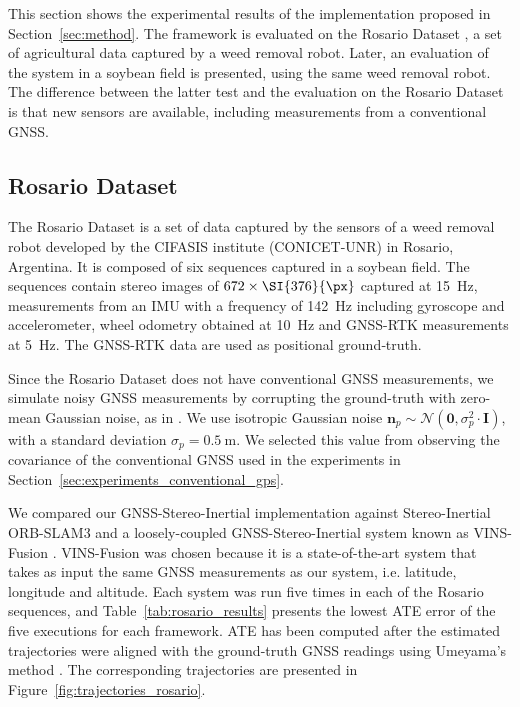 This section shows the experimental results of the implementation proposed in Section~\ref{sec:method}. The framework is evaluated on the Rosario Dataset \cite{pire2019rosario}, a set of agricultural data captured by a weed removal robot. Later, an evaluation of the system in a soybean field is presented, using the same weed removal robot. The difference between the latter test and the evaluation on the Rosario Dataset is that new sensors are available, including measurements from a conventional GNSS.

\subsection{Rosario Dataset}
\label{sec:experiments_rosario_dataset}
The Rosario Dataset \cite{pire2019rosario} is a set of data captured by the sensors of a weed removal robot developed by the CIFASIS institute (CONICET-UNR) in Rosario, Argentina. It is composed of six sequences captured in a soybean field. The sequences contain stereo images of $672\times\SI{376}{\px}$ captured at \SI{15}{\hertz}, measurements from an IMU with a frequency of \SI{142}{\hertz} including gyroscope and accelerometer, wheel odometry obtained at \SI{10}{\hertz} and GNSS-RTK measurements at \SI{5}{\hertz}. The GNSS-RTK data are used as positional ground‐truth.

Since the Rosario Dataset does not have conventional GNSS measurements, we simulate noisy GNSS measurements by corrupting the ground-truth with zero-mean Gaussian noise, as in \cite{cioffi2020tightly}. We use isotropic Gaussian noise $\mathbf{n}_{p}\sim\mathcal{N}\left(\mathbf{0},\sigma_{p}^{2}\cdot\mathbf{I}\right)$, with a standard deviation $\sigma_{p} = \SI{0.5}{\meter}$. We selected this value from observing the covariance of the conventional GNSS used in the experiments in Section~\ref{sec:experiments_conventional_gps}. 



We compared our GNSS-Stereo-Inertial implementation against Stereo-Inertial ORB-SLAM3 and a loosely-coupled GNSS-Stereo-Inertial system known as VINS-Fusion \cite{qin2019general}. VINS-Fusion was chosen because it is a state-of-the-art system that takes as input the same GNSS measurements as our system, i.e. latitude, longitude and altitude. Each system was run five times in each of the Rosario sequences, and Table~\ref{tab:rosario_results} presents the lowest ATE error of the five executions for each framework. ATE
has been computed after the estimated trajectories
were aligned with the ground-truth GNSS readings using Umeyama's method \cite{umeyama1991least}. The corresponding trajectories are presented in Figure~\ref{fig:trajectories_rosario}. %

